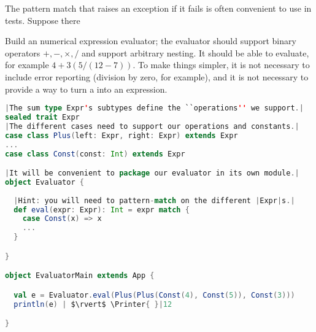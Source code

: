 \documentclass[10 pt]{article}
\begin{document}
The pattern match that raises an exception if it fails is often convenient to use in tests. Suppose there 

\begin{example}
Build an numerical expression evaluator; the evaluator should support binary operators $+, -, \times, /$ and support arbitrary nesting. It should be able to evaluate, for example $4+3(5/(12-7))$. To make things simpler, it is not necessary to include error reporting (division by zero, for example), and it is not necessary to provide a way to turn a  into an expression.

\begin{lstlisting}[caption={Expression evaluator}, label={code:ee}, language=Scala, escapechar=|]
|The sum type Expr's subtypes define the ``operations'' we support.|
sealed trait Expr
|The different cases need to support our operations and constants.|
case class Plus(left: Expr, right: Expr) extends Expr
...
case class Const(const: Int) extends Expr

|It will be convenient to package our evaluator in its own module.|
object Evaluator {
  
  |Hint: you will need to pattern-match on the different |Expr|s.|
  def eval(expr: Expr): Int = expr match {
    case Const(x) => x
    ...
  }

}

object EvaluatorMain extends App {

  val e = Evaluator.eval(Plus(Plus(Const(4), Const(5)), Const(3)))
  println(e) | $\rvert$ \Printer{ }|12

}
\end{lstlisting}
\end{example}
\end{document}
